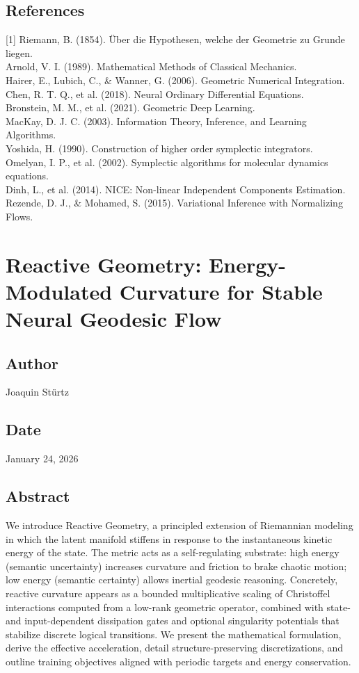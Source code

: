 \documentclass{article}
\numberwithin{equation}{section}
\begin{document}
\subsection*{References}
[1] Riemann, B. (1854). Über die Hypothesen, welche der Geometrie zu Grunde liegen.\\
[2] Arnold, V. I. (1989). Mathematical Methods of Classical Mechanics.\\
[3] Hairer, E., Lubich, C., \& Wanner, G. (2006). Geometric Numerical Integration.\\
[4] Chen, R. T. Q., et al. (2018). Neural Ordinary Differential Equations.\\
[5] Bronstein, M. M., et al. (2021). Geometric Deep Learning.\\
[6] MacKay, D. J. C. (2003). Information Theory, Inference, and Learning Algorithms.\\
[7] Yoshida, H. (1990). Construction of higher order symplectic integrators.\\
[8] Omelyan, I. P., et al. (2002). Symplectic algorithms for molecular dynamics equations.\\
[9] Dinh, L., et al. (2014). NICE: Non-linear Independent Components Estimation.\\
[10] Rezende, D. J., \& Mohamed, S. (2015). Variational Inference with Normalizing Flows.

\section{Reactive Geometry: Energy-Modulated Curvature for Stable Neural Geodesic Flow}
\subsection*{Author}
Joaquin Stürtz
\subsection*{Date}
January 24, 2026
\subsection*{Abstract}
We introduce Reactive Geometry, a principled extension of Riemannian modeling in which the latent manifold stiffens in response to the instantaneous kinetic energy of the state. The metric acts as a self-regulating substrate: high energy (semantic uncertainty) increases curvature and friction to brake chaotic motion; low energy (semantic certainty) allows inertial geodesic reasoning. Concretely, reactive curvature appears as a bounded multiplicative scaling of Christoffel interactions computed from a low-rank geometric operator, combined with state- and input-dependent dissipation gates and optional singularity potentials that stabilize discrete logical transitions. We present the mathematical formulation, derive the effective acceleration, detail structure-preserving discretizations, and outline training objectives aligned with periodic targets and energy conservation.
\end{document}
